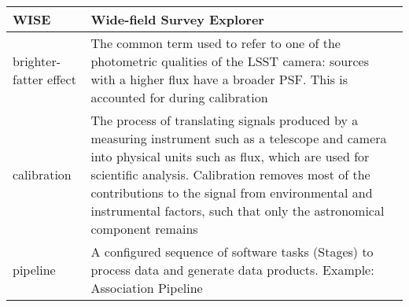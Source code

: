 \begin{longtable}{|p{}|p{}|}
WISE & Wide-field Survey Explorer \\\hline
brighter-fatter effect & The common term used to refer to one of the photometric qualities of the LSST camera: sources with a higher flux have a broader PSF. This is accounted for during calibration \\\hline
calibration & The process of translating signals produced by a measuring instrument such as a telescope and camera into physical units such as flux, which are used for scientific analysis. Calibration removes most of the contributions to the signal from environmental and instrumental factors, such that only the astronomical component remains \\\hline
pipeline & A configured sequence of software tasks (Stages) to process data and generate data products. Example: Association Pipeline \\\hline
\end{longtable}
